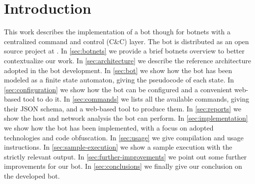\section{Introduction}
\label{sec:introduction}

This work describes the implementation of a bot though for botnets with a centralized command and control (C\&C) layer. The bot is distributed as an open source project at \cite{project-repo}.
In \ref{sec:botnets} we provide a brief botnets overview to better contextualize our work.
In \ref{sec:architecture} we describe the reference architecture adopted in the bot development.
In \ref{sec:bot} we show how the bot has been modeled as a finite state automaton, giving the pseudocode of each state.
In \ref{sec:configuration} we show how the bot can be configured and a convenient web-based tool to do it.
In \ref{sec:commands} we lists all the available commands, giving their JSON schema, and a web-based tool to produce them.
In \ref{sec:reports} we show the host and network analysis the bot can perform.
In \ref{sec:implementation} we show how the bot has been implemented, with a focus on adopted technologies and code obfuscation.
In \ref{sec:usage} we give compilation and usage instructions.
In \ref{sec:sample-execution} we show a sample execution with the strictly relevant output.
In \ref{sec:further-improvements} we point out some further improvements for our bot.
In \ref{sec:conclusions} we finally give our conclusion on the developed bot.
